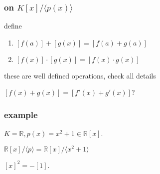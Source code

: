 \documentclass[letterpaper]{article}
\begin{document}
\subsubsection*{on $K[x]/\langle p(x)\rangle$}
define
\begin{enumerate}
\item
$[f(a)]+[g(x)]=[f(a)+g(a)]$
\item
$[f(x)]\cdot [g(x)]=[f(x)\cdot g(x)]$
\end{enumerate}
these are well defined operations, check all details

$[f(x)+g(x)]=[f'(x)+g'(x)]$?

\subsubsection*{example}
$K=\mathbb{R}, p(x)=x^2+1\in \mathbb{R}[x]$.

$\mathbb{R}[x]/\langle p\rangle =\mathbb{R}[x]/\langle x^2+1\rangle$

$[x]^2=-[1]$.
\end{document}
